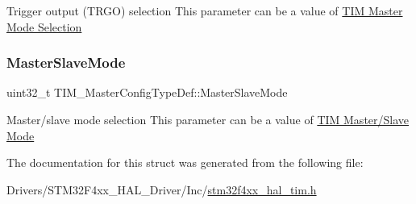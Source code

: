 Trigger output (T\+R\+GO) selection This parameter can be a value of \hyperlink{group___t_i_m___master___mode___selection}{T\+IM Master Mode Selection} \mbox{\label{struct_t_i_m___master_config_type_def_a45ddfca310a1180e19fc24b36f8e9585}} 
\subsubsection{\texorpdfstring{Master\+Slave\+Mode}{MasterSlaveMode}}
{\footnotesize\ttfamily uint32\+\_\+t T\+I\+M\+\_\+\+Master\+Config\+Type\+Def\+::\+Master\+Slave\+Mode}

Master/slave mode selection This parameter can be a value of \hyperlink{group___t_i_m___master___slave___mode}{T\+IM Master/\+Slave Mode} 

The documentation for this struct was generated from the following file\+:\begin{DoxyCompactItemize}
\item 
Drivers/\+S\+T\+M32\+F4xx\+\_\+\+H\+A\+L\+\_\+\+Driver/\+Inc/\hyperlink{stm32f4xx__hal__tim_8h}{stm32f4xx\+\_\+hal\+\_\+tim.\+h}\end{DoxyCompactItemize}
